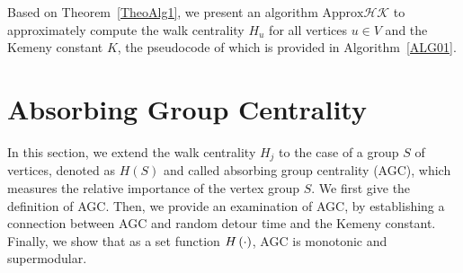\documentclass[10pt,twocolumn,twoside]{IEEEtran}
\begin{document}
Based on Theorem~\ref{TheoAlg1}, we  present an algorithm \(\text{Approx}\mathcal{HK}\) to approximately compute the walk centrality \(H_u\) for all  vertices  \(u \in V\) and the Kemeny constant \(K\), the pseudocode of which is provided in Algorithm~\ref{ALG01}.


\section{Absorbing Group Centrality }

In this section, we extend the walk centrality \(H_j\) to the case of a group  $S$ of  vertices, denoted as \(H(S)\) and called absorbing group centrality (AGC), which measures the relative importance of the vertex group $S$. We first give the definition of AGC. Then, we provide an examination of AGC, by establishing a connection between AGC and random detour time and the Kemeny constant. Finally, we show that as a set function \(H\left(\cdot\right)\), AGC is monotonic and supermodular.

\end{document}
